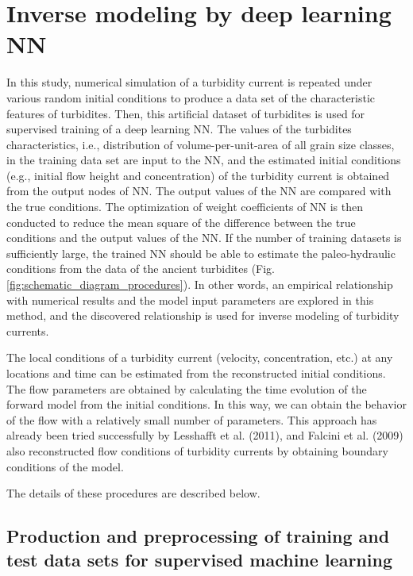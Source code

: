 
\section{Inverse modeling by deep learning NN}
In this study, numerical simulation of a turbidity current is repeated under various random initial conditions to produce a data set of the characteristic features of turbidites. Then, this artificial dataset of turbidites is used for supervised training of a deep learning NN. The values of the turbidites characteristics, i.e., distribution of volume-per-unit-area of all grain size classes, in the training data set are input to the NN, and the estimated initial conditions (e.g., initial flow height and concentration) of the turbidity current is obtained from the output nodes of NN. The output values of the NN are compared with the true conditions. The optimization of weight coefficients of NN is then conducted to reduce the mean square of the difference between the true conditions and the output values of the NN. If the number of training datasets is sufficiently large, the trained NN should be able to estimate the paleo-hydraulic conditions from the data of the ancient turbidites (Fig. \ref{fig:schematic_diagram_procedures}). In other words, an empirical relationship with numerical results and the model input parameters are explored in this method, and the discovered relationship is used for inverse modeling of turbidity currents. 

The local conditions of a turbidity current (velocity, concentration, etc.) at any locations and time can be estimated from the reconstructed initial conditions. The flow parameters are obtained by calculating the time evolution of the forward model from the initial conditions. In this way, we can obtain the behavior of the flow with a relatively small number of parameters. This approach has already been tried successfully by Lesshafft et al. (2011), and Falcini et al. (2009) also reconstructed flow conditions of turbidity currents by obtaining boundary conditions of the model.

The details of these procedures are described below.

\subsection{Production and preprocessing of training and test data sets for supervised machine learning}

